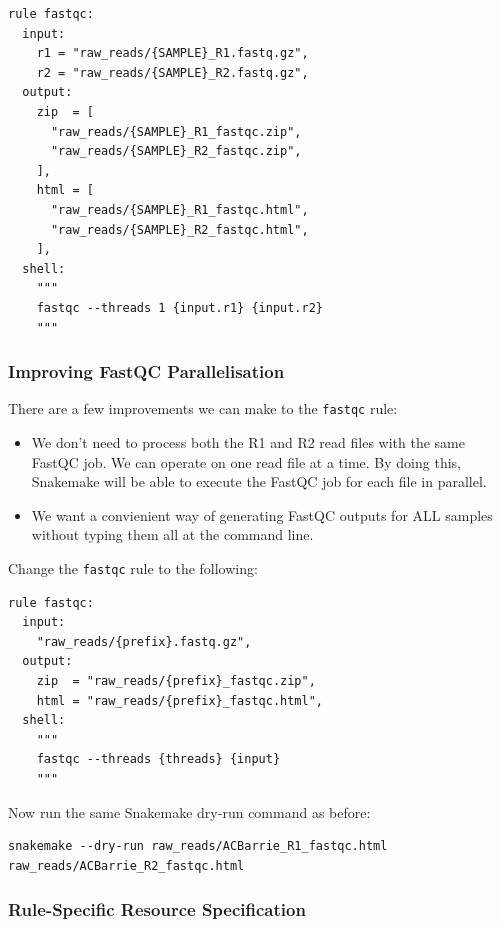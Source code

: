 \begin{lstlisting}
rule fastqc:
  input:
    r1 = "raw_reads/{SAMPLE}_R1.fastq.gz",
    r2 = "raw_reads/{SAMPLE}_R2.fastq.gz",
  output:
    zip  = [
      "raw_reads/{SAMPLE}_R1_fastqc.zip",
      "raw_reads/{SAMPLE}_R2_fastqc.zip",
    ],
    html = [
      "raw_reads/{SAMPLE}_R1_fastqc.html",
      "raw_reads/{SAMPLE}_R2_fastqc.html",
    ],
  shell:
    """
    fastqc --threads 1 {input.r1} {input.r2}
    """
\end{lstlisting}

\subsubsection{Improving FastQC Parallelisation}

There are a few improvements we can make to the \texttt{fastqc} rule:

\begin{itemize}
  \item We don't need to process both the R1 and R2 read files with the same FastQC job.
	We can operate on one read file at a time.
        By doing this, Snakemake will be able to execute the FastQC job for each file in parallel.
  \item We want a convienient way of generating FastQC outputs for ALL samples without typing them all at the command line.
\end{itemize}

Change the \texttt{fastqc} rule to the following:

\begin{lstlisting}
rule fastqc:
  input:
    "raw_reads/{prefix}.fastq.gz",
  output:
    zip  = "raw_reads/{prefix}_fastqc.zip",
    html = "raw_reads/{prefix}_fastqc.html",
  shell:
    """
    fastqc --threads {threads} {input}
    """
\end{lstlisting}

Now run the same Snakemake dry-run command as before:

\begin{lstlisting}
snakemake --dry-run raw_reads/ACBarrie_R1_fastqc.html raw_reads/ACBarrie_R2_fastqc.html
\end{lstlisting}

\subsubsection{Rule-Specific Resource Specification}

